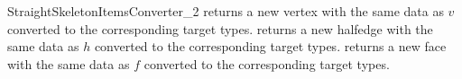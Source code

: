 \begin{ccRefConcept}{StraightSkeletonItemsConverter_2}
\ccTagFullDeclarations
{}
{ returns a new vertex with the same data as $v$ converted to the corresponding target types.}
\ccGlue
{}
{ returns a new halfedge with the same data as $h$ converted to the corresponding target types.}
\ccGlue
{}
{ returns a new face with the same data as $f$ converted to the corresponding target types.}

\ccHasModels


\ccSeeAlso
{}

\end{ccRefConcept}

